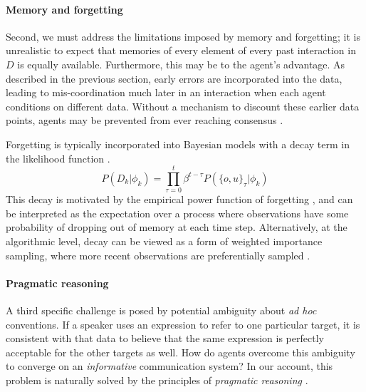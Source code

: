 \paragraph{Memory and forgetting}

Second, we must address the limitations imposed by memory and forgetting; it is unrealistic to expect that memories of every element of every past interaction in $D$ is equally available.
Furthermore, this may be to the agent's advantage. 
As described in the previous section, early errors are incorporated into the data, leading to mis-coordination much later in an interaction when each agent conditions on different data.
Without a mechanism to discount these earlier data points, agents may be prevented from ever reaching consensus \cite{spike_minimal_2017}.

Forgetting is typically incorporated into Bayesian models with a decay term in the likelihood function \cite{anderson2000adaptive,angela2009sequential,fudenberg2014recency,kalm2018visual}.
$$P(D_k | \phi_k) = \prod_{\tau=0}^t \beta^{t-\tau} P(\{o,u\}_\tau | \phi_k)$$
This decay is motivated by the empirical power function of forgetting \cite{wixted1991form}, and can be interpreted as the expectation over a process where observations have some probability of dropping out of memory at each time step.
Alternatively, at the algorithmic level, decay can be viewed as a form of weighted importance sampling, where more recent observations are preferentially sampled \cite{pearl2010online}.

\paragraph{Pragmatic reasoning}

A third specific challenge is posed by potential ambiguity about \emph{ad hoc} conventions.
If a speaker uses an expression to refer to one particular target, it is consistent with that data to believe that the same expression is perfectly acceptable for the other targets as well. 
How do agents overcome this ambiguity to converge on an \emph{informative} communication system?
In our account, this problem is naturally solved by the principles of \textit{pragmatic reasoning} \cite{Grice75_LogicConversation}.

